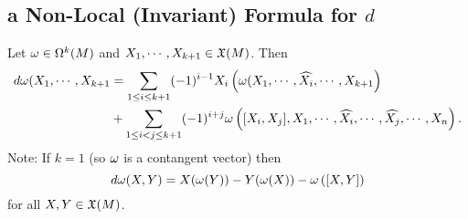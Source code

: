 \subsection{a Non-Local (Invariant) Formula for $d$}
\begin{proposition}\label{14.32}
    Let $\omega \in \Omega^k(M)$ and $X_1,\cdots,X_{k+1} \in \frak{X}(M)$. Then 
    \begin{align*}
    d\omega(X_1,\cdots,X_{k+1}
    &= \sum_{1\leq i \leq k+1} (-1)^{i-1}X_i\left(\omega(X_1,\cdots,\widehat{X_i},\cdots,X_{k+1}\right) \\
    &+ \sum_{1 \leq i < j \leq k+1} (-1)^{i+j} \omega \left(
    [X_i,X_j], X_1, \cdots, \widehat{X_i}, \cdots, \widehat{X_j}, \cdots, X_n
    \right).
    \end{align*}
    Note: If $k = 1$ (so $\omega$ is a contangent vector) then 
    $$ d\omega(X,Y) = X(\omega(Y)) - Y(\omega(X)) - \omega\left([X,Y]\right)$$ for all $X,Y \in \frak{X}(M)$.
\end{proposition}
